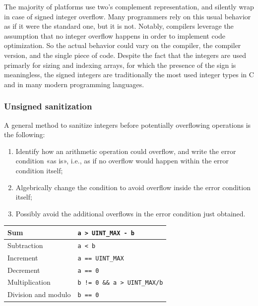 \documentclass[a4paper,12pt]{article}
\begin{document}
The majority of platforms use two’s complement representation, and silently wrap in case of signed integer overflow. Many programmers rely on this usual behavior as if it were the standard one, but it is not. Notably, compilers leverage the assumption that no integer overflow happens in order to implement code optimization. So the actual behavior could vary on the compiler, the compiler version, and the single piece of code.
Despite the fact that the integers are used primarly for sizing and indexing arrays, for which the presence of the sign is meaningless, the signed integers are traditionally the most used integer types in C and in many modern programming languages.

\subsubsection{Unsigned sanitization}
A general method to sanitize integers before potentially overflowing operations is the following:
\begin{enumerate}
	\item Identify how an arithmetic operation could overflow, and write the error condition «as is», i.e., as if no overflow would happen within the error condition itself;
	\item Algebrically change the condition to avoid overflow inside the error condition itself;
	\item Possibly avoid the additional overflows in the error condition just obtained.
\end{enumerate}

\begin{center}
\begin{tabular}{|l|l|}
\hline
Sum & \texttt{a > UINT\_MAX - b} \\
\hline
Subtraction & \texttt{a < b} \\
\hline
Increment & \texttt{a == UINT\_MAX} \\
\hline
Decrement & \texttt{a == 0} \\
\hline
Multiplication & \texttt{b != 0 \&\& a > UINT\_MAX/b} \\
\hline
Division and modulo & \texttt{b == 0} \\
\hline
\end{tabular}
\end{center}
\end{document}
